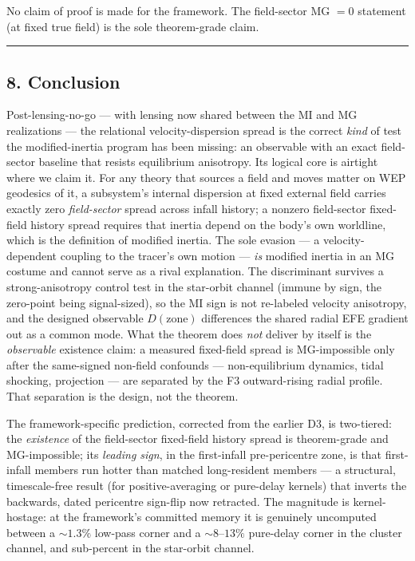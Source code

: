 \documentclass[
]{article}
\begin{document}
No claim of proof is made for the framework. The field-sector MG \(=0\)
statement (at fixed true field) is the sole theorem-grade claim.

\begin{center}\rule{0.5\linewidth}{0.5pt}\end{center}

\subsection{8. Conclusion}\label{conclusion}

Post-lensing-no-go --- with lensing now shared between the MI and MG
realizations --- the relational velocity-dispersion spread is the
correct \emph{kind} of test the modified-inertia program has been
missing: an observable with an exact field-sector baseline that resists
equilibrium anisotropy. Its logical core is airtight where we claim it.
For any theory that sources a field and moves matter on WEP geodesics of
it, a subsystem's internal dispersion at fixed external field carries
exactly zero \emph{field-sector} spread across infall history; a nonzero
field-sector fixed-field history spread requires that inertia depend on
the body's own worldline, which is the definition of modified inertia.
The sole evasion --- a velocity-dependent coupling to the tracer's own
motion --- \emph{is} modified inertia in an MG costume and cannot serve
as a rival explanation. The discriminant survives a strong-anisotropy
control test in the star-orbit channel (immune by sign, the zero-point
being signal-sized), so the MI sign is not re-labeled velocity
anisotropy, and the designed observable \(D(\text{zone})\) differences
the shared radial EFE gradient out as a common mode. What the theorem
does \emph{not} deliver by itself is the \emph{observable} existence
claim: a measured fixed-field spread is MG-impossible only after the
same-signed non-field confounds --- non-equilibrium dynamics, tidal
shocking, projection --- are separated by the F3 outward-rising radial
profile. That separation is the design, not the theorem.

The framework-specific prediction, corrected from the earlier D3, is
two-tiered: the \emph{existence} of the field-sector fixed-field history
spread is theorem-grade and MG-impossible; its \emph{leading sign}, in
the first-infall pre-pericentre zone, is that first-infall members run
hotter than matched long-resident members --- a structural,
timescale-free result (for positive-averaging or pure-delay kernels)
that inverts the backwards, dated pericentre sign-flip now retracted.
The magnitude is kernel-hostage: at the framework's committed memory it
is genuinely uncomputed between a \(\sim1.3\%\) low-pass corner and a
\(\sim8\)--\(13\%\) pure-delay corner in the cluster channel, and
sub-percent in the star-orbit channel.
\end{document}
